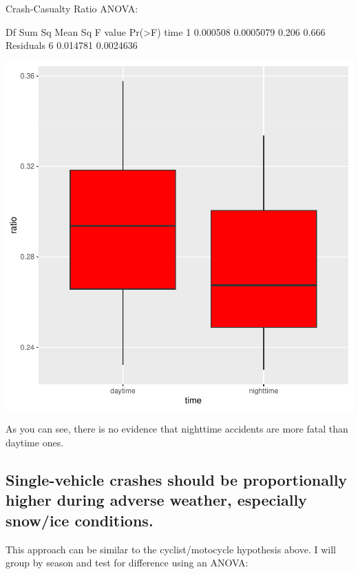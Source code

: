 \documentclass[11pt, a4paper]{article}
\begin{document}
\begin{Schunk}
\begin{Soutput}
Crash-Casualty Ratio ANOVA:
\end{Soutput}
\begin{Soutput}
            Df   Sum Sq   Mean Sq F value Pr(>F)
time         1 0.000508 0.0005079   0.206  0.666
Residuals    6 0.014781 0.0024636               
\end{Soutput}
\end{Schunk}
\includegraphics{regression-049}


As you can see, there is no evidence that nighttime accidents are more fatal than daytime ones. 





\pagebreak
\subsection{Single-vehicle crashes should be proportionally higher during adverse weather, especially snow/ice conditions.}

This approach can be similar to the cyclist/motocycle hypothesis above. I will group by season and test for difference using an ANOVA:
\end{document}
